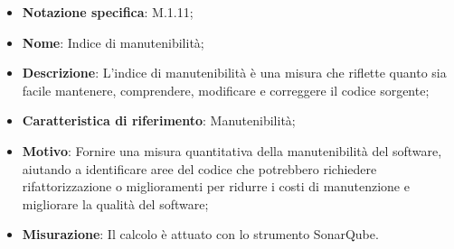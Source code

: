 \begin{itemize}
    \item \textbf{Notazione specifica}: M.1.11;
    \item \textbf{Nome}: Indice di manutenibilità;
    \item \textbf{Descrizione}: L'indice di manutenibilità è una misura che riflette quanto sia facile mantenere, comprendere, modificare e correggere il codice sorgente;
    \item \textbf{Caratteristica di riferimento}: Manutenibilità;
    \item \textbf{Motivo}: Fornire una misura quantitativa della manutenibilità del software, aiutando a identificare aree del codice che potrebbero richiedere rifattorizzazione o miglioramenti per ridurre i costi di manutenzione e migliorare la qualità del software;
    \item \textbf{Misurazione}: Il calcolo è attuato con lo strumento SonarQube.
    
\end{itemize}
